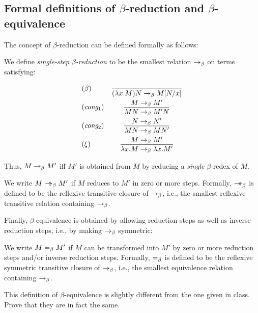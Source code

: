 \documentclass{article}
\begin{document}
\subsection{Formal definitions of $\beta$-reduction and $\beta$-equivalence}

The concept of $\beta$-reduction can be defined formally as follows:

\begin{definition}\label{page-def-beta}
  We define {\em single-step $\beta$-reduction} to be the smallest
  relation $\rightarrow_{\beta}$ on terms satisfying:
  \[ \begin{array}{lc}
    \nrule{\beta} &
    \deriv{}{(\lam x.M)N\redb \subst{M}{N}{x}} \nl
    \trule{cong$_1$} &
    \deriv{M\redb M'}{MN\redb M'N} \nl
    \trule{cong$_2$} &
    \deriv{N\redb N'}{MN\redb MN'} \nl
    \nrule{\xi} &
    \deriv{M\redb M'}{\lam x.M\redb \lam x.M'}
  \end{array}
  \]
\end{definition}

Thus, $M\rightarrow_{\beta} M'$ iff $M'$ is obtained from $M$ by reducing a {\em
  single} $\beta$-redex of $M$.

\begin{definition}
  We write $M\mathrel{\rightarrow\!\!\!\!\!\rightarrow}_{\beta} M'$ if $M$ reduces to $M'$ in zero or more steps.
  Formally, $\mathrel{\rightarrow\!\!\!\!\!\rightarrow}_{\beta}$ is defined to be the reflexive transitive
  closure of $\rightarrow_{\beta}$, i.e., the smallest reflexive transitive
  relation containing $\rightarrow_{\beta}$. 
\end{definition}
  
Finally, $\beta$-equivalence is obtained by allowing reduction steps
as well as inverse reduction steps, i.e., by making $\rightarrow_{\beta}$
symmetric:

\begin{definition}
  We write $M=_{\beta} M'$ if $M$ can be transformed into $M'$ by zero or
  more reduction steps and/or inverse reduction steps. Formally,
  $=_{\beta}$ is defined to be the reflexive symmetric transitive closure
  of $\rightarrow_{\beta}$, i.e., the smallest equivalence relation containing
  $\rightarrow_{\beta}$. 
\end{definition}

\begin{exercise}
  This definition of $\beta$-equivalence is slightly different from
  the one given in class. Prove that they are in fact the same.
\end{exercise}

\end{document}

